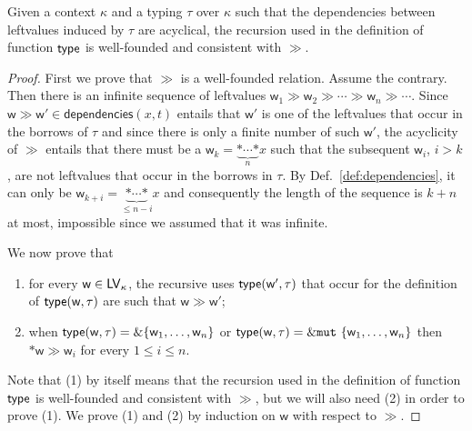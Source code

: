 \begin{proposition}\label{prop:acyclicity}
  Given a context $\kappa$ and a typing $\tau$ over $\kappa$
  such that the dependencies between leftvalues induced by $\tau$ are acyclical,
  the recursion used in the definition of function $\mathsf{type}$ is well-founded and consistent with $\gg$.
\end{proposition}
\begin{proof}
  First we prove that $\gg$ is a well-founded relation. Assume the contrary. Then
  there is an infinite sequence of leftvalues
  $\mathsf{w}_1\gg\mathsf{w}_2\gg\cdots\gg\mathsf{w}_n\gg\cdots$.
  Since $\mathsf{w}\gg\mathsf{w}'\in\mathsf{dependencies}(x,t)$ entails that
  $\mathsf{w}'$ is one of the leftvalues that occur in the borrows of $\tau$ and
  since there is only a finite number of such $\mathsf{w}'$, the acyclicity of $\gg$ entails that
  there must be a $\mathsf{w}_k=\underbrace{\mathtt{*}\cdots\mathtt{*}}_{\text{$n$}}x$
  such that the subsequent $\mathsf{w}_i$, $i>k$,
  are not leftvalues that occur in the borrows in $\tau$. By Def.~\ref{def:dependencies},
  it can only be $\mathsf{w}_{k+i}=\underbrace{\mathtt{*}\cdots\mathtt{*}}_{\text{$\le n-i$}}x$
  and consequently the length of the sequence is $k+n$ at most, impossible since we assumed that
  it was infinite.

  We now prove that
  \begin{enumerate}
  \item for every $\mathsf{w}\in\mathsf{LV}_\kappa$, the
    recursive uses $\mathsf{type}(\mathsf{w}',\tau)$ that occur for the definition
    of $\mathsf{type}(\mathsf{w},\tau)$ are such that $\mathsf{w}\gg\mathsf{w}'$;
  \item when $\mathsf{type}(\mathsf{w},\tau)=\&\{\mathsf{w}_1,\ldots,\mathsf{w}_n\}$
    or $\mathsf{type}(\mathsf{w},\tau)=\&\mathtt{mut}\ \{\mathsf{w}_1,\ldots,\mathsf{w}_n\}$
    then $\mathtt{*}\mathsf{w}\gg\mathsf{w}_i$ for every $1\le i\le n$.
  \end{enumerate}
  Note that (1) by itself means that
  the recursion used in the
  definition of function $\mathsf{type}$ is well-founded and consistent with $\gg$, but we will also
  need (2) in order to prove (1).
  We prove (1) and (2) by induction on $\mathsf{w}$ with respect to $\gg$.


\end{proof}
